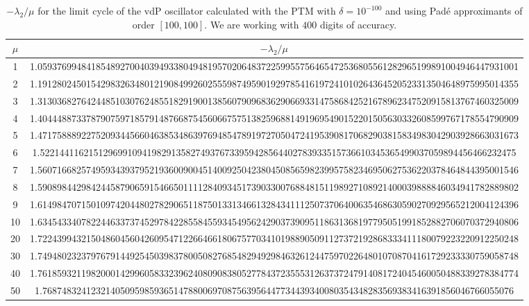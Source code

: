 \documentclass[final]{article}
\begin{document}
\begin{table}
\caption{$-\lambda_2/\mu$ for the limit cycle of the vdP oscillator calculated with the PTM with $\delta=10^{-100}$ and using Pad\'e approximants of order $[100,100]$. We are working with $400$ digits of accuracy. }
\bigskip
\label{table_Lyap_vdP1}
\begin{center}
\begin{tabular}{|c|c|}
\hline
$\mu$ &   $-\lambda_2/\mu$    \\
\hline
1   &   1.059376994841854892700403949338049481957020648372259955756465472536805561282965199891004946447931001   \\
2   &   1.191280245015429832634801219084992602555987495901929785416197241010264364520523313504648975995014355   \\
3   &   1.313036827642448510307624855182919001385607909683629066933147586842521678962347520915813767460325009   \\
4   &   1.404448873378790759718579148766875456066757513825968814919695490152201505630332608599767178554790909   \\
5   &   1.471758889227520934456604638534863976948547891972705047241953908170682903815834983042903928663031673   \\
6   &   1.52214411621512969910941982913582749376733959428564402783933515736610345365499037059894456466232475    \\
7   &   1.560716682574959343937952193600900451400925042380450856598239957582346950627536220378464844395001546   \\
8   &   1.590898442984244587906591546650111128409345173903300768848151198927108921400039888846034941782889802   \\
9   &   1.614984707150109742044802782906511875013313466132843411125073706400635468630590270929565212004124396   \\
10  &   1.634543340782244633737452978422855845593454956242903739095118631368197795051991852882706070372940806   \\
20  &   1.722439943215048604560426095471226646618067577034101988905091127372192868333411180079223220912250248   \\
30  &   1.749480232379767914492545039837800508276854829492984632612447597022648010708704161729233330759058748   \\
40  &   1.761859321198200014299605833239624080908380527784372355531263737247914081724045460050488339278384774   \\
50  &   1.7687483241232140509598593651478800697087563956447734439340080354348283569383416391856046766055076 \\

\end{tabular}
\end{center}
\end{table}
\end{document}
